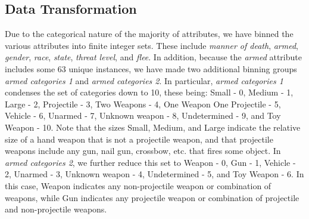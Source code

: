 \documentclass[10pt, conference, compsocconf]{IEEEtran}
\begin{document}
\subsection{Data Transformation}

Due to the categorical nature of the majority of attributes, we have binned the various attributes into finite integer sets. These include \textit{manner of death}, \textit{armed}, \textit{gender}, \textit{race}, \textit{state}, \textit{threat level}, and \textit{flee}. In addition, because the \textit{armed} attribute includes some 63 unique instances, we have made two additional binning groups \textit{armed categories 1} and \textit{armed categories 2}. In particular, \textit{armed categories 1} condenses the set of categories down to 10, these being: Small - 0, Medium - 1, Large - 2, Projectile - 3, Two Weapons - 4, One Weapon One Projectile - 5, Vehicle - 6, Unarmed - 7, Unknown weapon - 8, Undetermined - 9, and Toy Weapon - 10. Note that the sizes Small, Medium, and Large indicate the relative size of a hand weapon that is not a projectile weapon, and that projectile weapons include any gun, nail gun, crossbow, etc. that fires some object. In \textit{armed categories 2}, we further reduce this set to Weapon - 0, Gun - 1, Vehicle - 2, Unarmed - 3, Unknown weapon - 4, Undetermined - 5, and Toy Weapon - 6. In this case, Weapon indicates any non-projectile weapon or combination of weapons, while Gun indicates any projectile weapon or combination of projectile and non-projectile weapons. 

%	
\end{document}
